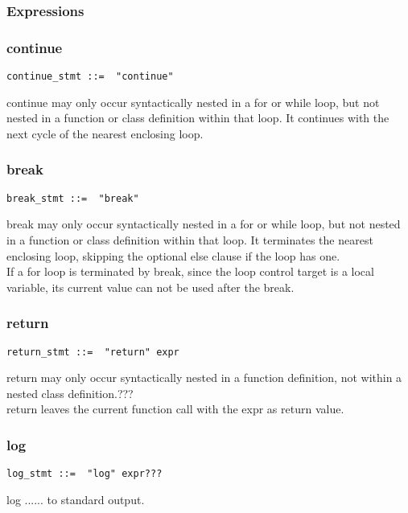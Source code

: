 \documentclass[12pt]{article}
\begin{document}
\subsubsection{Expressions} %
\subsubsection{continue} %
\begin{lstlisting}[caption=continue]
continue_stmt ::=  "continue"
\end{lstlisting}
continue may only occur syntactically nested in a for or while loop, but not nested in a function or class definition within that loop. It continues with the next cycle of the nearest enclosing loop.

\subsubsection{break} %
\begin{lstlisting}[caption=break]
break_stmt ::=  "break"
\end{lstlisting}
break may only occur syntactically nested in a for or while loop, but not nested in a function or class definition within that loop. It terminates the nearest enclosing loop, skipping the optional else clause if the loop has one.\\
If a for loop is terminated by break, since the loop control target is a local variable, its current value can not be used after the break.

\subsubsection{return} %
\begin{lstlisting}[caption=return]
return_stmt ::=  "return" expr
\end{lstlisting}
return may only occur syntactically nested in a function definition, not within a nested class definition.???\\ %
return leaves the current function call with the expr as return value.\\

\subsubsection{log} %
\begin{lstlisting}[caption=log]
log_stmt ::=  "log" expr???
\end{lstlisting}
log ...... to standard output.
\end{document}
